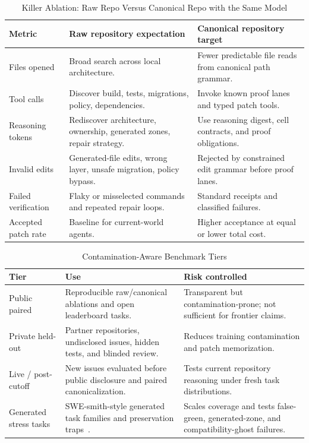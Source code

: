 \begin{table}[t]
\caption{Killer Ablation: Raw Repo Versus Canonical Repo with the Same Model}
\label{tab:killerablation}
\centering
\footnotesize
\begin{tabularx}{\textwidth}{p{}X X}
\toprule
Metric & Raw repository expectation & Canonical repository target \\
\midrule
Files opened & Broad search across local architecture. & Fewer predictable file reads from canonical path grammar. \\
Tool calls & Discover build, tests, migrations, policy, dependencies. & Invoke known proof lanes and typed patch tools. \\
Reasoning tokens & Rediscover architecture, ownership, generated zones, repair strategy. & Use reasoning digest, cell contracts, and proof obligations. \\
Invalid edits & Generated-file edits, wrong layer, unsafe migration, policy bypass. & Rejected by constrained edit grammar before proof lanes. \\
Failed verification & Flaky or misselected commands and repeated repair loops. & Standard receipts and classified failures. \\
Accepted patch rate & Baseline for current-world agents. & Higher acceptance at equal or lower total cost. \\
\bottomrule
\end{tabularx}
\end{table}

\begin{table}[t]
\caption{Contamination-Aware Benchmark Tiers}
\label{tab:benchmarktiers}
\centering
\footnotesize
\begin{tabularx}{\textwidth}{p{}X X}
\toprule
Tier & Use & Risk controlled \\
\midrule
Public paired & Reproducible raw/canonical ablations and open leaderboard tasks. & Transparent but contamination-prone; not sufficient for frontier claims. \\
Private held-out & Partner repositories, undisclosed issues, hidden tests, and blinded review. & Reduces training contamination and patch memorization. \\
Live / post-cutoff & New issues evaluated before public disclosure and paired canonicalization. & Tests current repository reasoning under fresh task distributions. \\
Generated stress tasks & SWE-smith-style generated task families and preservation traps~\cite{sweSmith}. & Scales coverage and tests false-green, generated-zone, and compatibility-ghost failures. \\
\bottomrule
\end{tabularx}
\end{table}

